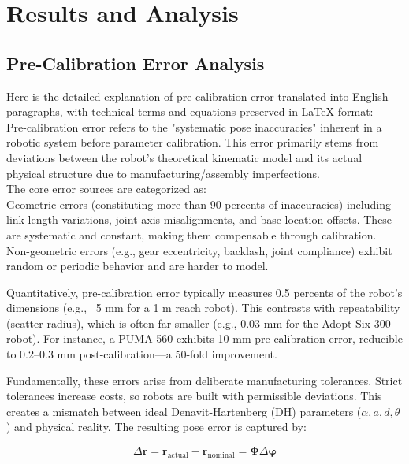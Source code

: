 \documentclass[conference]{IEEEtran}
\begin{document}
\section{Results and Analysis}

\subsection{Pre-Calibration Error Analysis}
\indent Here is the detailed explanation of pre-calibration error translated into English paragraphs, with technical terms and equations preserved in LaTeX format:\\
\indent Pre-calibration error refers to the "systematic pose inaccuracies" inherent in a robotic system before parameter calibration. This error primarily stems from deviations between the robot's theoretical kinematic model and its actual physical structure due to manufacturing/assembly imperfections.\\

The core error sources are categorized as:\\ 
\indent Geometric errors (constituting more than 90 percents of inaccuracies) including link-length variations, joint axis misalignments, and base location offsets. These are systematic and constant, making them compensable through calibration. Non-geometric errors (e.g., gear eccentricity, backlash, joint compliance) exhibit random or periodic behavior and are harder to model.  

Quantitatively, pre-calibration error typically measures 0.5 percents of the robot's dimensions (e.g., ~5 mm for a 1 m reach robot). This contrasts with repeatability (scatter radius), which is often far smaller (e.g., 0.03 mm for the Adopt Six 300 robot). For instance, a PUMA 560 exhibits 10 mm pre-calibration error, reducible to 0.2–0.3 mm post-calibration—a 50-fold improvement.  

Fundamentally, these errors arise from deliberate manufacturing tolerances. Strict tolerances increase costs, so robots are built with permissible deviations. This creates a mismatch between ideal Denavit-Hartenberg (DH) parameters ($\alpha, a, d, \theta$) and physical reality. The resulting pose error is captured by:  

\begin{equation}
    \Delta \mathbf{r} = \mathbf{r}_{\text{actual}} - \mathbf{r}_{\text{nominal}} = \mathbf{\Phi} \Delta \mathbf{\varphi}
\end{equation}
\end{document}
